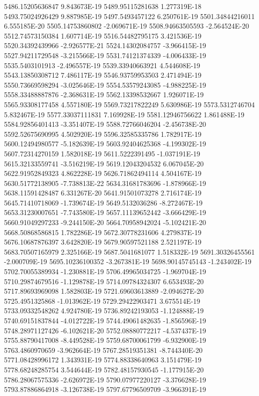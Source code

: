 5486.15205636847  9.843673E-19
5489.95115281638  1.277319E-18
5493.75024926429  9.887985E-19
5497.5493457122  6.250761E-19
5501.34844216011  6.555185E-20
5505.14753860802  -2.069671E-19
5508.94663505593  -2.564524E-20
5512.74573150384  1.607714E-19
5516.54482795175  3.421536E-19
5520.34392439966  -2.926577E-21
5524.14302084757  -3.966415E-19
5527.94211729548  -3.215566E-19
5531.74121374339  -4.006433E-19
5535.5403101913  -2.496557E-19
5539.33940663921  4.544608E-19
5543.13850308712  7.486117E-19
5546.93759953503  2.471494E-19
5550.73669598294  -3.025646E-19
5554.53579243085  -4.988225E-19
5558.33488887876  -2.368631E-19
5562.13398532667  1.926071E-19
5565.93308177458  4.557180E-19
5569.73217822249  5.630986E-19
5573.5312746704  5.832467E-19
5577.33037111831  7.169928E-19
5581.12946756622  1.861488E-19
5584.92856401413  -3.351407E-19
5588.72766046204  -2.456738E-20
5592.52675690995  4.502920E-19
5596.32585335786  1.782917E-19
5600.12494980577  -5.182639E-19
5603.92404625368  -4.199302E-19
5607.72314270159  1.582018E-19
5611.5222391495  -1.037191E-19
5615.32133559741  -3.516219E-19
5619.12043204532  6.067045E-20
5622.91952849323  4.862228E-19
5626.71862494114  4.504167E-19
5630.51772138905  -7.738813E-22
5634.31681783696  -1.878966E-19
5638.11591428487  6.331267E-20
5641.91501073278  2.716174E-19
5645.71410718069  -1.739674E-19
5649.5132036286  -8.272467E-19
5653.31230007651  -7.743580E-19
5657.11139652442  -3.666429E-19
5660.91049297233  -9.244150E-20
5664.70958942024  -5.102421E-20
5668.50868586815  1.782286E-19
5672.30778231606  4.279837E-19
5676.10687876397  3.642820E-19
5679.90597521188  2.521197E-19
5683.70507165979  2.325166E-19
5687.5041681077  1.518332E-19
5691.30326455561  -2.000709E-19
5695.10236100352  -3.267381E-19
5698.90145745143  -1.243402E-19
5702.70055389934  -1.230881E-19
5706.49965034725  -1.969704E-19
5710.29874679516  -1.129878E-19
5714.09784324307  6.653493E-20
5717.89693969098  1.582803E-19
5721.69603613889  -2.094627E-20
5725.4951325868  -1.013962E-19
5729.29422903471  3.675514E-19
5733.09332548262  4.924780E-19
5736.89242193053  -1.124888E-19
5740.69151837844  -4.012722E-19
5744.49061482635  -1.856596E-19
5748.28971127426  -6.102621E-20
5752.08880772217  -4.537437E-19
5755.88790417008  -8.449528E-19
5759.68700061799  -6.932900E-19
5763.4860970659  -3.962664E-19
5767.28519351381  -8.744340E-20
5771.08428996172  1.343931E-19
5774.88338640963  3.151479E-19
5778.68248285754  3.544644E-19
5782.48157930545  -1.177915E-20
5786.28067575336  -2.626972E-19
5790.07977220127  -3.376628E-19
5793.87886864918  -3.126738E-19
5797.67796509709  -3.966391E-19
